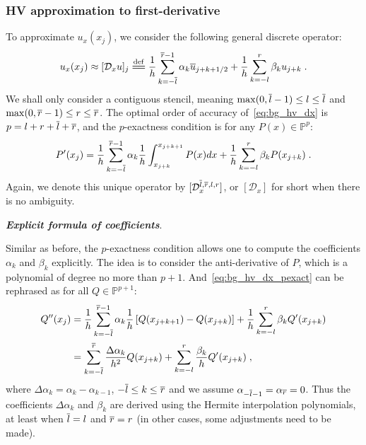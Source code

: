 \subsubsection{HV approximation to first-derivative}
\label{sec:bg_hv_dx}
To approximate $u_x(x_j)$, we consider the following general discrete operator:
\begin{equation}\label{eq:bg_hv_dx}
  u_x(x_j) \approx [\mathcal{D}_xu]_j \eqdef \frac{1}{h}\sum_{k=-\bl}^{\br-1}\alpha_k\overline{u}_{\phf{j+k}}+\frac{1}{h}\sum_{k=-l}^r\beta_ku_{j+k}\;.
\end{equation}
We shall only consider a contiguous stencil, meaning $\max(0,\overline{l}-1)\le l\le \overline{l}$ and $\max(0,\overline{r}-1)\le r\le\overline{r}$.
The optimal order of accuracy of~\cref{eq:bg_hv_dx} is $p=l+r+\overline{l}+\overline{r}$, and the $p$-exactness condition is for any $P(x)\in\mathbb{P}^p$:
\begin{equation}\label{eq:bg_hv_dx_pexact}
  P'(x_j) = \frac{1}{h}\sum_{k=-\overline{l}}^{\overline{r}-1}\alpha_k\frac{1}{h}\int_{x_{j+k}}^{x_{j+k+1}}P(x)dx+\frac{1}{h}\sum_{k=-l}^r\beta_kP(x_{j+k})\;.
\end{equation}
Again, we denote this unique operator by $[\mathcal{D}^{\overline{l},\overline{r},l,r}_x]$, or $[\mathcal{D}_x]$ for short when there is no ambiguity.

\medskip

\noindent
\textbf{\textit{Explicit formula of coefficients}}.

\smallskip
Similar as before, the $p$-exactness condition allows one to compute the coefficients $\alpha_k$ and $\beta_k$ explicitly.
The idea is to consider the anti-derivative of $P$, which is a polynomial of degree no more than $p+1$.
And~\cref{eq:bg_hv_dx_pexact} can be rephrased as for all $Q\in\mathbb{P}^{p+1}$:
\begin{align}
  \notag
  Q''(x_j) &= \frac{1}{h}\sum_{k=-\overline{l}}^{\overline{r}-1}\alpha_k\frac{1}{h}\left[Q(x_{j+k+1})-Q(x_{j+k})\right]+\frac{1}{h}\sum_{k=-l}^r\beta_kQ'(x_{j+k}) \\
  \label{eq:bg_hv_dx_qexact}
  &= \sum_{k=-\overline{l}}^{\overline{r}}\frac{\Delta\alpha_k}{h^2}Q(x_{j+k}) + \sum_{k=-l}^{r}\frac{\beta_k}{h}Q'(x_{j+k})\;,
\end{align}
where $\Delta\alpha_k=\alpha_k-\alpha_{k-1}$, $-\overline{l}\le k\le\overline{r}$ and we assume $\alpha_{-\overline{l}-1}=\alpha_{\overline{r}}=0$.
Thus the coefficients $\Delta\alpha_k$ and $\beta_k$ are derived using the Hermite interpolation polynomials, at least when $\overline{l}=l$ and $\overline{r}=r$ (in other cases, some adjustments need to be made).

